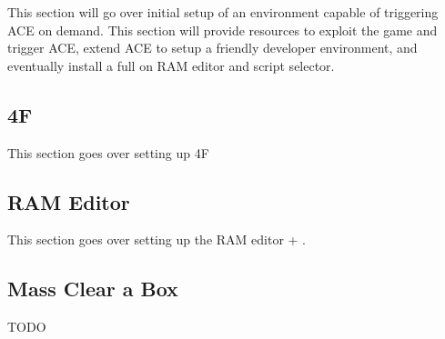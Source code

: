 \documentclass[../main.tex]{subfile}
\begin{document}
    This section will go over initial setup of an environment capable of triggering ACE on demand.  This section will provide resources to exploit the game and trigger ACE, extend ACE to setup a friendly developer environment, and eventually install a full on RAM editor and script selector.

    \subsection{4F}
    This section goes over setting up 4F

    \subsection{RAM Editor}
    This section goes over setting up the RAM editor + \selector{}.

    \subsection{Mass Clear a Box}
    TODO
\end{document}
